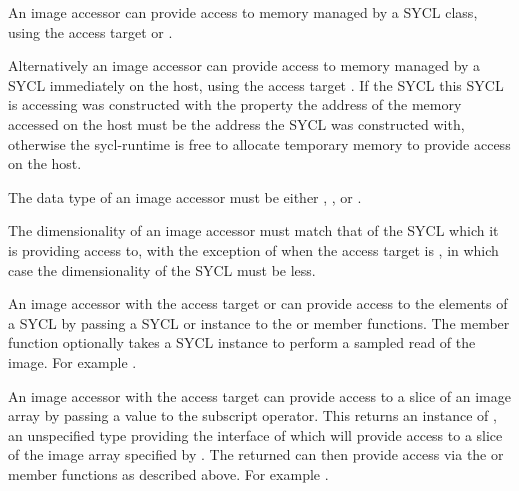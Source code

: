 An image accessor can provide access to memory managed by a SYCL  class, using the access target  or
.

Alternatively an image accessor can provide access to memory managed by a SYCL
 immediately on the \gls{host}, using the access target
. If the SYCL  this
SYCL  is accessing was constructed with the property 
 the address of the memory accessed
on the \gls{host} must be the address the SYCL  was
constructed with, otherwise the \gls{sycl-runtime} is free to allocate
temporary memory to provide access on the \gls{host}.

The data type of an image accessor must be either , ,  or .

The dimensionality of an image accessor must match that of the SYCL
 which it is providing access to, with the exception of when
the access target is , in which case
the dimensionality of the SYCL  must be 
less.

An image accessor with the access target  or
 can provide access to the elements of a
SYCL  by passing a SYCL  or  instance to the  or  member
functions. The  member function optionally takes a SYCL
 instance to perform a sampled read of the image. For
example .

An image accessor with the access target  can provide access to a slice of an image array by
passing a  value to the subscript operator. This returns an
instance of , an unspecified type providing
the interface of  which will provide access
to a slice of the image array specified by . The
 returned can then provide access via the
 or  member functions as described above. For
example .


